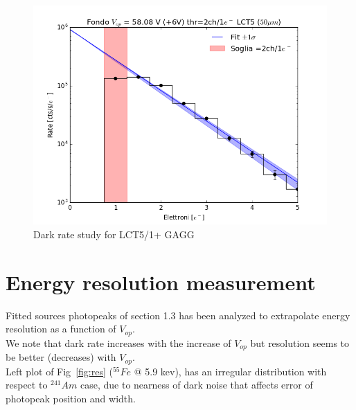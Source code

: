 \documentclass[10pt,a4paper, openany]{book}
\begin{document}
\begin{figure}[!h]
\begin{center}
\includegraphics[scale=0.25]{imm/fit6_2.png}
\end{center}
\caption{Dark rate study for LCT5/1+ GAGG} 
\label{fig:noise}
\end{figure}


\section{Energy resolution measurement}
Fitted sources photopeaks of section 1.3 has been analyzed to extrapolate energy resolution as a function of $V_{op}$.\\
We note that dark rate increases with the increase of $V_{op}$ but resolution seems to be better (decreases) with $V_{op}$.\\
Left plot of Fig~\ref{fig:res} ($^{55}Fe$ @ 5.9 kev), has an irregular distribution with respect to $^{241}Am$ case, due to nearness of dark noise that affects error of photopeak position and width. 
\end{document}
